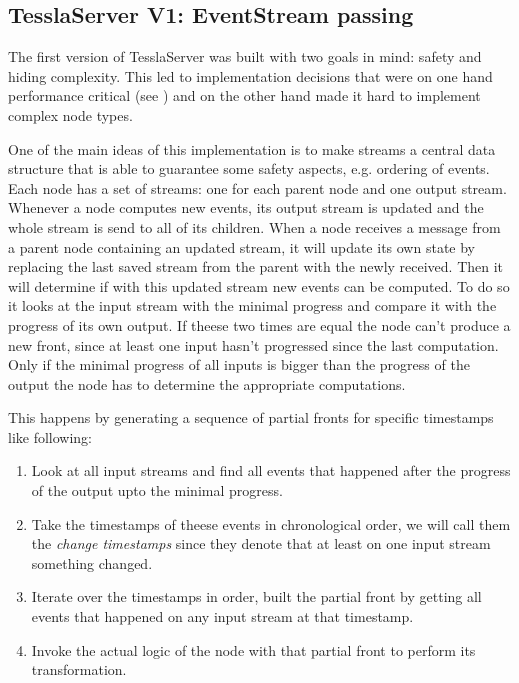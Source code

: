 \subsection{TesslaServer V1: EventStream passing}
\label{sec:implementation:tesslaserver:v1}

The first version of TesslaServer was built with two goals in mind: safety and hiding complexity.
This led to implementation decisions that were on one hand performance critical (see ) and on the other hand made it hard to implement complex node types.

One of the main ideas of this implementation is to make streams a central data structure that is able to guarantee some safety aspects, e.g. ordering of events.
Each node has a set of streams: one for each parent node and one output stream.
Whenever a node computes new events, its output stream is updated and the whole stream is send to all of its children.
When a node receives a message from a parent node containing an updated stream, it will update its own state by replacing the last saved stream from the parent with the newly received.
Then it will determine if with this updated stream new events can be computed.
To do so it looks at the input stream with the minimal progress and compare it with the progress of its own output.
If theese two times are equal the node can't produce a new front, since at least one input hasn't progressed since the last computation.
Only if the minimal progress of all inputs is bigger than the progress of the output the node has to determine the appropriate computations.

This happens by generating a sequence of partial fronts for specific timestamps like following:

\begin{enumerate}
  \item Look at all input streams and find all events that happened after the progress of the output upto the minimal progress.
  \item Take the timestamps of theese events in chronological order, we will call them the \emph{change timestamps} since they denote that at least on one input stream something changed.
  \item Iterate over the timestamps in order, built the partial front by getting all events that happened on any input stream at that timestamp.
  \item Invoke the actual logic of the node with that partial front to perform its transformation.
\end{enumerate}

